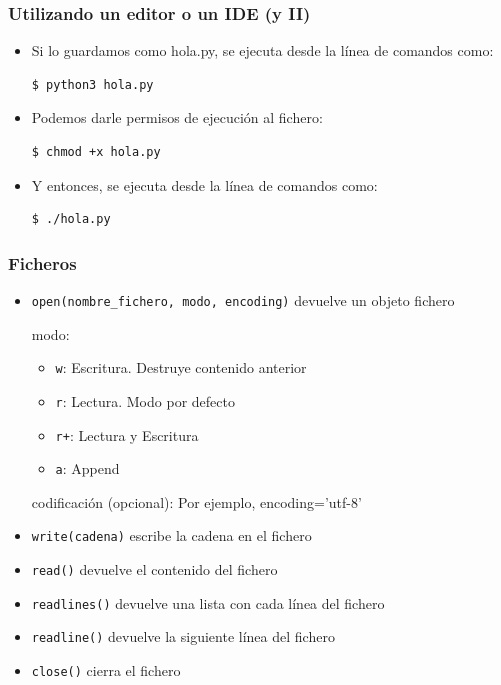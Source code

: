 \documentclass{beamer}
\begin{document}
\begin{frame}[fragile]
\frametitle{Utilizando un editor o un IDE (y II)}


\begin{itemize}
  \item Si lo guardamos como hola.py, se ejecuta desde la línea de comandos como:
\begin{footnotesize}
\begin{verbatim}
$ python3 hola.py
\end{verbatim}
\end{footnotesize}

  \item Podemos darle permisos de ejecución al fichero:
\begin{footnotesize}
\begin{verbatim}
$ chmod +x hola.py
\end{verbatim}
\end{footnotesize}

  \item Y entonces, se ejecuta desde la línea de comandos como:
\begin{footnotesize}
\begin{verbatim}
$ ./hola.py
\end{verbatim}
\end{footnotesize}


  
\end{itemize}

\end{frame}



\begin{frame}[fragile]
\frametitle{Ficheros}
\begin{itemize}
  
\item \verb|open(nombre_fichero, modo, encoding)| devuelve un objeto fichero

modo:
\begin{itemize}
  
\item \verb|w|: Escritura. Destruye contenido anterior
\item \verb|r|: Lectura. Modo por defecto
\item \verb|r+|: Lectura y Escritura
\item \verb|a|: Append

\end{itemize}

codificación (opcional): Por ejemplo, encoding='utf-8'

\item \verb|write(cadena)| escribe la cadena en el fichero  
\item \verb|read()| devuelve el contenido del fichero
\item \verb|readlines()| devuelve una lista con cada línea del fichero
\item \verb|readline()| devuelve la siguiente línea del fichero
\item \verb|close()| cierra el fichero

\end{itemize}
\end{frame}
\end{document}

